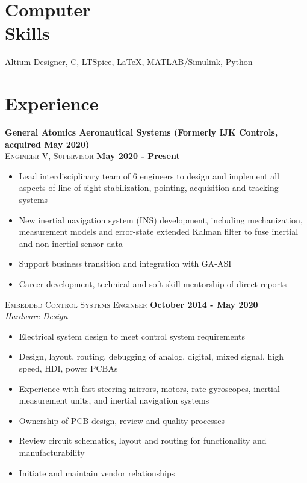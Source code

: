 \documentclass[margin,line]{resume}
\begin{document}
\begin{resume}
    \section{\mysidestyle Computer\\ Skills}

    Altium Designer, C, LTSpice, \LaTeX , MATLAB/Simulink, Python


    \section{\mysidestyle Experience}
    
    \textbf{General Atomics Aeronautical Systems (Formerly IJK Controls, acquired May 2020)}\\
    \textsc{Engineer V, Supervisor} \hfill \textbf{May 2020 - Present}\\ \vspace{-4mm}
    \begin{itemize} \itemsep -2pt
    		\item Lead interdisciplinary team of 6 engineers to design and implement all aspects of line-of-sight stabilization, pointing, acquisition and tracking systems
		\item New inertial navigation system (INS) development, including mechanization, measurement models and error-state extended Kalman filter to fuse inertial and non-inertial sensor data
    		\item Support business transition and integration with GA-ASI
		\item Career development, technical and soft skill mentorship of direct reports
    	\end{itemize} \vspace{-2.25mm}
    	
    \textsc{Embedded Control Systems Engineer} \hfill \textbf{October 2014 - May 2020}\\ \vspace{-4mm}
    \textsl{Hardware Design}\\
    \begin{itemize} \itemsep -2pt
    		\item Electrical system design to meet control system requirements
        \item Design, layout, routing, debugging of analog, digital, mixed signal, high speed, HDI, power PCBAs
        \item Experience with fast steering mirrors, motors, rate gyroscopes, inertial measurement units, and inertial navigation systems
        \item Ownership of PCB design, review and quality processes
        \item Review circuit schematics, layout and routing for functionality and manufacturability
        \item Initiate and maintain vendor relationships
     \end{itemize}\vspace{-4mm}
     

\end{resume}
\end{document}
